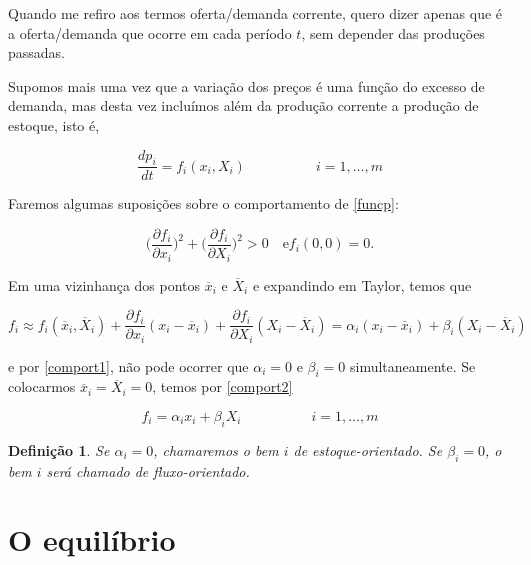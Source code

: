 \documentclass[
	12pt,				%
	openright,			%
	twoside,			%
	a4paper,			%
	english,			%
	french,				%
	spanish,			%
	brazil				%
	]{abntex2}
\newtheorem{definicao}{Definição}[chapter]
\newcommand{\espaco}{\hspace{5em}}
\newcommand{\xbarra}{\overline{x}}
\begin{document}
Quando me refiro aos termos oferta/demanda corrente, quero dizer apenas que é a
oferta/demanda que ocorre em cada período $t$, sem depender das produções passadas.

Supomos mais uma vez que a variação dos preços é uma função
do excesso de demanda, mas desta vez incluímos além da produção corrente a produção de estoque, isto é,

\begin{equation} \label{funcp}
	\frac{dp_i}{dt} = f_i(x_i, X_i) \espaco i = 1, \ldots, m
\end{equation}

Faremos algumas suposições sobre o comportamento de \ref{funcp}:

\begin{subequations}

\begin{equation} \label{comport1}
		\bigg(\frac{\partial f_i}{\partial x_i}\bigg)^2 + \bigg(\frac{\partial f_i}{\partial X_i}\bigg)^2 > 0 \quad \text{e}
\end{equation}

\begin{equation} \label{comport2}
			f_i(0, 0) = 0.
\end{equation}
\end{subequations}

Em uma vizinhança dos pontos $\xbarra_i$ e $\overline{X}_i$ e expandindo em Taylor, temos que

\begin{equation}
	f_i \approx f_i(\xbarra_i, \overline{X}_i) + \frac{\partial f_i}{\partial x_i}(x_i - \xbarra_i)
	 	  + \frac{\partial f_i}{\partial X_i}(X_i - \overline{X}_i)
			= \alpha_i(x_i - \xbarra_i) + \beta_i(X_i - \overline{X}_i)
\end{equation}

e por \ref{comport1}, não pode ocorrer que $\alpha_i = 0$ e $\beta_i = 0$ simultaneamente.
Se colocarmos $\xbarra_i = \overline{X}_i = 0$, temos por \ref{comport2}

\begin{equation} \label{qi}
	f_i = \alpha_ix_i + \beta_iX_i \espaco i = 1, \ldots, m
\end{equation}

\begin{definicao}
	Se $\alpha_i = 0$, chamaremos o bem $i$ de estoque-orientado. Se $\beta_i = 0$,
	o bem $i$ será chamado de fluxo-orientado.
\end{definicao}

\section{O equilíbrio}
\end{document}
